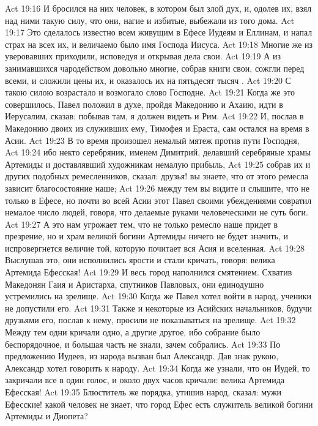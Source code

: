\vs Act 19:16 И бросился на них человек, в котором был злой дух, и, одолев их, взял над ними такую силу, что они, нагие и избитые, выбежали из того дома.
\vs Act 19:17 Это сделалось известно всем живущим в Ефесе Иудеям и Еллинам, и напал страх на всех их, и величаемо было имя Господа Иисуса.
\vs Act 19:18 Многие же из уверовавших приходили, исповедуя и открывая дела свои.
\vs Act 19:19 А из занимавшихся чародейством довольно многие, собрав книги свои, сожгли перед всеми, и сложили цены их, и оказалось их на пятьдесят тысяч .
\vs Act 19:20 С такою силою возрастало и возмогало слово Господне.
\rsbpar\vs Act 19:21 Когда же это совершилось, Павел положил в духе, пройдя Македонию и Ахаию, идти в Иерусалим, сказав: побывав там, я должен видеть и Рим.
\vs Act 19:22 И, послав в Македонию двоих из служивших ему, Тимофея и Ераста, сам остался на время в Асии.
\rsbpar\vs Act 19:23 В то время произошел немалый мятеж против пути Господня,
\vs Act 19:24 ибо некто серебряник, именем Димитрий, делавший серебряные храмы Артемиды и доставлявший художникам немалую прибыль,
\vs Act 19:25 собрав их и других подобных ремесленников, сказал: друзья! вы знаете, что от этого ремесла зависит благосостояние наше;
\vs Act 19:26 между тем вы видите и слышите, что не только в Ефесе, но почти во всей Асии этот Павел своими убеждениями совратил немалое число людей, говоря, что делаемые руками человеческими не суть боги.
\vs Act 19:27 А это нам угрожает тем, что не только ремесло наше придет в презрение, но и храм великой богини Артемиды ничего не будет значить, и испровергнется величие той, которую почитает вся Асия и вселенная.
\vs Act 19:28 Выслушав это, они исполнились ярости и стали кричать, говоря: велика Артемида Ефесская!
\vs Act 19:29 И весь город наполнился смятением. Схватив Македонян Гаия и Аристарха, спутников Павловых, они единодушно устремились на зрелище.
\vs Act 19:30 Когда же Павел хотел войти в народ, ученики не допустили его.
\vs Act 19:31 Также и некоторые из Асийских начальников, будучи друзьями его, послав к нему, просили не показываться на зрелище.
\vs Act 19:32 Между тем одни кричали одно, а другие другое, ибо собрание было беспорядочное, и большая часть  не знали, зачем собрались.
\vs Act 19:33 По предложению Иудеев, из народа вызван был Александр. Дав знак рукою, Александр хотел говорить к народу.
\vs Act 19:34 Когда же узнали, что он Иудей, то закричали все в один голос, и около двух часов кричали: велика Артемида Ефесская!
\vs Act 19:35 Блюститель же порядка, утишив народ, сказал: мужи Ефесские! какой человек не знает, что город Ефес есть служитель великой богини Артемиды и Диопета?
